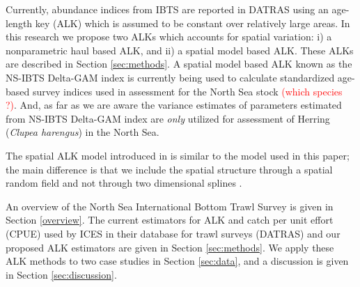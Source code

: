 \documentclass[a4paper 12pt]{article}
\numberwithin{equation}{section}
\newcommand{\ed}[1]{\textcolor{red}{#1}}
\begin{document}
Currently, abundance indices from IBTS are reported in DATRAS \citep{datras} using an age-length key (ALK) \citep{fridriksson1934calculation} which is assumed to be constant over relatively large areas. In this research we propose two ALKs which accounts for spatial variation: i) a nonparametric  haul based ALK, and ii) a spatial model based ALK. These ALKs are described in Section \ref{sec:methods}. %
A spatial model based ALK \citep{berg2012spatial, berg2014evaluation} known as the NS-IBTS Delta-GAM index \citep{ICES2016b} is currently being used to calculate standardized age-based survey indices used in assessment for the North Sea stock \ed{(which species ?)}. And, as far as we are aware the variance estimates of parameters estimated from NS-IBTS Delta-GAM index  are \textit{only} utilized for assessment of Herring (\textit{Clupea harengus}) in the North Sea.

The spatial ALK model introduced in \citet{berg2012spatial} is similar to the model used in this paper; the main difference is that we include the spatial structure through a spatial random field \citep{lindgren2011explicit} and not through two dimensional splines \citep{wood2017generalized}.

 An  overview of the  North Sea International Bottom Trawl Survey is given in Section \ref{overview}. The current estimators for ALK and catch per unit effort (CPUE) used by ICES in their database for trawl surveys (DATRAS) and our proposed ALK estimators are given in Section \ref{sec:methods}. We apply these ALK methods to two case studies in Section  \ref{sec:data}, and a discussion is given in Section \ref{sec:discussion}.
\end{document}
